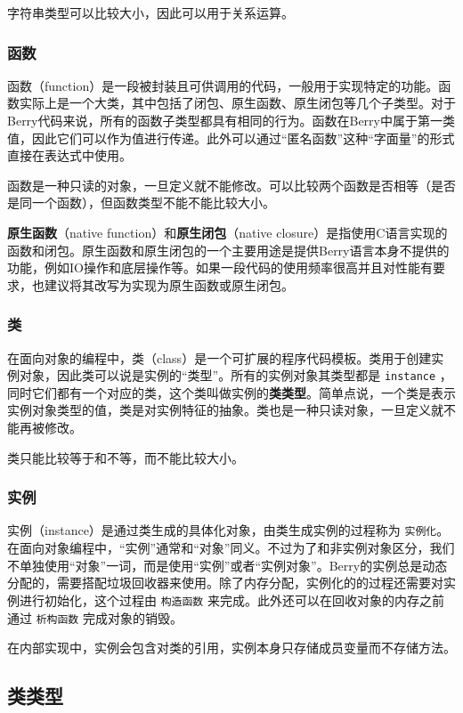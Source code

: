 字符串类型可以比较大小，因此可以用于关系运算。

\subsubsection{函数}

函数（function）是一段被封装且可供调用的代码，一般用于实现特定的功能。函数实际上是一个大类，其中包括了闭包、原生函数、原生闭包等几个子类型。对于Berry代码来说，所有的函数子类型都具有相同的行为。函数在Berry中属于第一类值，因此它们可以作为值进行传递。此外可以通过“匿名函数”这种“字面量”的形式直接在表达式中使用。

函数是一种只读的对象，一旦定义就不能修改。可以比较两个函数是否相等（是否是同一个函数），但函数类型不能不能比较大小。

\textbf{原生函数}（native function）和\textbf{原生闭包}（native closure）是指使用C语言实现的函数和闭包。原生函数和原生闭包的一个主要用途是提供Berry语言本身不提供的功能，例如IO操作和底层操作等。如果一段代码的使用频率很高并且对性能有要求，也建议将其改写为实现为原生函数或原生闭包。

\subsubsection{类}

在面向对象的编程中，类（class）是一个可扩展的程序代码模板。类用于创建实例对象，因此类可以说是实例的“类型”。所有的实例对象其类型都是 \texttt{instance} ，同时它们都有一个对应的类，这个类叫做实例的\textbf{类类型}。简单点说，一个类是表示实例对象类型的值，类是对实例特征的抽象。类也是一种只读对象，一旦定义就不能再被修改。

类只能比较等于和不等，而不能比较大小。

\subsubsection{实例}

实例（instance）是通过类生成的具体化对象，由类生成实例的过程称为 \texttt{实例化}。在面向对象编程中，“实例”通常和“对象”同义。不过为了和非实例对象区分，我们不单独使用“对象”一词，而是使用“实例”或者“实例对象”。Berry的实例总是动态分配的，需要搭配垃圾回收器来使用。除了内存分配，实例化的的过程还需要对实例进行初始化，这个过程由 \texttt{构造函数} 来完成。此外还可以在回收对象的内存之前通过 \texttt{析构函数} 完成对象的销毁。

在内部实现中，实例会包含对类的引用，实例本身只存储成员变量而不存储方法。

\subsection{类类型}

